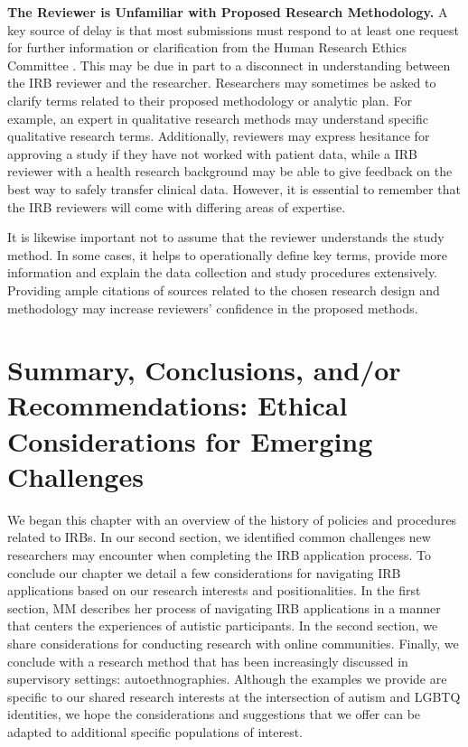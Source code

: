 \documentclass[
  11pt,
]{book}
\begin{document}
\textbf{The Reviewer is Unfamiliar with Proposed Research Methodology.} A key source of delay is that most submissions must respond to at least one request for further information or clarification from the Human Research Ethics Committee \citep{brandenburg_what_2021}. This may be due in part to a disconnect in understanding between the IRB reviewer and the researcher. Researchers may sometimes be asked to clarify terms related to their proposed methodology or analytic plan. For example, an expert in qualitative research methods may understand specific qualitative research terms. Additionally, reviewers may express hesitance for approving a study if they have not worked with patient data, while a IRB reviewer with a health research background may be able to give feedback on the best way to safely transfer clinical data. However, it is essential to remember that the IRB reviewers will come with differing areas of expertise.

It is likewise important not to assume that the reviewer understands the study method. In some cases, it helps to operationally define key terms, provide more information and explain the data collection and study procedures extensively. Providing ample citations of sources related to the chosen research design and methodology may increase reviewers' confidence in the proposed methods.

\section{Summary, Conclusions, and/or Recommendations: Ethical Considerations for Emerging Challenges}\label{summary-conclusions-andor-recommendations-ethical-considerations-for-emerging-challenges}

We began this chapter with an overview of the history of policies and procedures related to IRBs. In our second section, we identified common challenges new researchers may encounter when completing the IRB application process. To conclude our chapter we detail a few considerations for navigating IRB applications based on our research interests and positionalities. In the first section, MM describes her process of navigating IRB applications in a manner that centers the experiences of autistic participants. In the second section, we share considerations for conducting research with online communities. Finally, we conclude with a research method that has been increasingly discussed in supervisory settings: autoethnographies. Although the examples we provide are specific to our shared research interests at the intersection of autism and LGBTQ identities, we hope the considerations and suggestions that we offer can be adapted to additional specific populations of interest.
\end{document}
